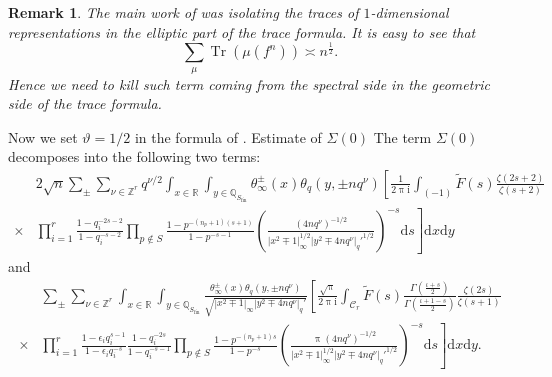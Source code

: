 \documentclass[10pt,oneside,reqno]{amsart}
\makeatletter
\newcommand\rmd{\mathrm{d}}
\newcommand\rmi{\mathrm{i}}
\newcommand\cC{\mathcal{C}}
\newcommand\QQ{\mathbb{Q}}
\newcommand\RR{\mathbb{R}}
\newcommand\ZZ{\mathbb{Z}}
\newcommand\dpii{2\uppi\rmi}
\DeclareMathOperator\Tr{Tr}
\newcommand\fin{\mathrm{fin}}
\newcommand\legendresymbol[2]{\genfrac{(}{)}{}{}{#1}{#2}}
\def\subsection{\@startsection{subsection}{2}
  \z@{3pt\@plus0pt}{-.5em}%
  {\normalfont\bfseries}}
\theoremstyle{THEOREM}
\theoremstyle{DEFINITION}
\theoremstyle{EXERCISE}
\newtheorem{remark}[theorem]{Remark}
\numberwithin{equation}{section}
\makeatother
\begin{document}
\begin{remark}
The main work of \cite{cheng2025} was isolating the traces of $1$-dimensional representations in the elliptic part of the trace formula. It is easy to see that 
\[
\sum_{\mu}\Tr(\mu(f^n))\asymp n^{\frac12}.
\]
Hence we need to kill such term coming from the spectral side in the geometric side of the trace formula.
\end{remark}

Now we set $\vartheta=1/2$ in the formula of \cite[Theorem 8.10]{cheng2025}. 
\subsection{Estimate of $\Sigma(0)$}
The term $\Sigma(0)$ decomposes into the following two terms:
\begin{equation}\label{eq:sigma01}
\begin{split}
&2\sqrt{n}\sum_{\pm}\sum_{\nu\in \ZZ^r}q^{\nu/2}\int_{x\in \RR}\int_{y\in \QQ_{S_\fin}}\theta_\infty^\pm(x)\theta_{q}(y,\pm nq^\nu)
  \left[\frac{1}{\dpii}\int_{(-1)}\widetilde{F}(s)\frac{\zeta(2s+2)}{\zeta(s+2)} \right.\\
  \times&\left.\prod_{i=1}^{r}\frac{1-q_i^{-2s-2}}{1-q_i^{-s-2}}\prod_{p\notin S}\frac{1-p^{-(n_p+1)(s+1)}}{1-p^{-s-1}}\legendresymbol{(4nq^\nu)^{-1/2}}{|x^2\mp 1|_\infty^{1/2}|y^2\mp 4nq^\nu|_q'^{1/2}}^{-s}\rmd s\right]\rmd x\rmd y
\end{split}
\end{equation}
and
\begin{equation}\label{eq:sigma02}  
\begin{split}
  &\sum_{\pm}\sum_{\nu\in \ZZ^r}\int_{x\in \RR}\int_{y\in \QQ_{S_\fin}}\frac{\theta_\infty^\pm(x)\theta_{q}(y,\pm nq^\nu)}{\sqrt{|x^2\mp 1|_\infty|y^2\mp 4nq^\nu|_q'}}\left[\frac{\sqrt{\uppi}}{\dpii}\int_{\cC_r}\widetilde{F}(s) \frac{\Gamma(\frac{\iota+s}{2})}{\Gamma(\frac{\iota+1-s}{2})}\frac{\zeta(2s)}{\zeta(s+1)} \right.\\
  \times&\left. \prod_{i=1}^{r}\frac{1-\epsilon_i q_i^{s-1}}{1-\epsilon_i q_i^{-s}}\frac{1-q_i^{-2s}}{1-q_i^{-s-1}}\prod_{p\notin S}\frac{1-p^{-(n_p+1)s}}{1-p^{-s}} \legendresymbol{\uppi (4nq^\nu)^{-1/2}}{|x^2\mp 1|_\infty^{1/2}|y^2\mp 4nq^\nu|_q'^{1/2}}^{-s}\rmd s\right]
  \rmd x\rmd y.
\end{split}
\end{equation}
\end{document}

